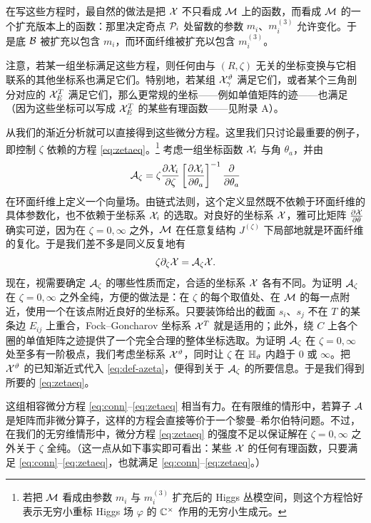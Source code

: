 在写这些方程时，最自然的做法是把 $\mathcal{X}$ 不只看成 $\mathcal{M}$ 上的函数，而看成 $\mathcal{M}$ 的一个扩充版本上的函数：那里决定奇点 $\mathcal{P}_i$ 处留数的参数 $m_i$、$m_i^{(3)}$ 允许变化。于是底 $\mathcal{B}$ 被扩充以包含 $m_i$，而环面纤维被扩充以包含 $m_i^{(3)}$。

注意，若某一组坐标满足这些方程，则任何由与 $(R,\zeta)$ 无关的坐标变换与它相联系的其他坐标系也满足它们。特别地，若某组 $\mathcal{X}^\vartheta_\gamma$ 满足它们，或者某个三角剖分对应的 $\mathcal{X}^T_E$ 满足它们，那么更常规的坐标——例如单值矩阵的迹——也满足（因为这些坐标可以写成 $\mathcal{X}^T_E$ 的某些有理函数——见附录 A）。%

从我们的渐近分析就可以直接得到这些微分方程。这里我们只讨论最重要的例子，即控制 $\zeta$ 依赖的方程 \eqref{eq:zetaeq}。\footnote{若把 $\mathcal{M}$ 看成由参数 $m_i$ 与 $m_i^{(3)}$ 扩充后的 Higgs 丛模空间，则这个方程恰好表示无穷小重标 Higgs 场 $\varphi$ 的 $\mathbb{C}^\times$ 作用的无穷小生成元。} 考虑一组坐标函数 $\mathcal{X}_i$ 与角 $\theta_a$，并由
\begin{equation} \label{eq:def-azeta}
\mathcal{A}_\zeta = \zeta\frac{\partial\mathcal{X}_i}{\partial\zeta}\left[\frac{\partial\mathcal{X}_i}{\partial\theta_a}\right]^{-1}\frac{\partial}{\partial\theta_a}
\end{equation}
在环面纤维上定义一个向量场。由链式法则，这个定义显然既不依赖于环面纤维的具体参数化，也不依赖于坐标系 $\mathcal{X}_i$ 的选取。对良好的坐标系 $\mathcal{X}$，雅可比矩阵 $\frac{\partial\mathcal{X}}{\partial\theta}$ 确实可逆，因为在 $\zeta=0,\infty$ 之外，$\mathcal{M}$ 在任意复结构 $J^{(\zeta)}$ 下局部地就是环面纤维的复化。于是我们差不多是同义反复地有
\begin{equation}
\zeta\partial_\zeta\mathcal{X} = \mathcal{A}_\zeta\mathcal{X}. \label{eq:zetaeqtaut}
\end{equation}
现在，视需要确定 $\mathcal{A}_\zeta$ 的哪些性质而定，合适的坐标系 $\mathcal{X}$ 各有不同。为证明 $\mathcal{A}_\zeta$ 在 $\zeta=0,\infty$ 之外全纯，方便的做法是：在 $\zeta$ 的每个取值处、在 $\mathcal{M}$ 的每一点附近，使用一个在该点附近良好的坐标系。只要装饰给出的截面 $s_i$、$s_j$ 不在 $T$ 的某条边 $E_{ij}$ 上重合，Fock–Goncharov 坐标系 $\mathcal{X}^T$ 就是适用的；此外，绕 $C$ 上各个圈的单值矩阵之迹提供了一个完全合理的整体坐标选取。为证明 $\mathcal{A}_\zeta$ 在 $\zeta=0,\infty$ 处至多有一阶极点，我们考虑坐标系 $\mathcal{X}^\vartheta$，同时让 $\zeta$ 在 ${\mathbb{H}}_\vartheta$ 内趋于 $0$ 或 $\infty$。把 $\mathcal{X}^\vartheta$ 的已知渐近式代入 \eqref{eq:def-azeta}，便得到关于 $\mathcal{A}_\zeta$ 的所要信息。于是我们得到所要的 \eqref{eq:zetaeq}。

这组相容微分方程 \eqref{eq:conn}–\eqref{eq:zetaeq} 相当有力。在有限维的情形中，若算子 $\mathcal{A}$ 是矩阵而非微分算子，这样的方程会直接等价于一个黎曼–希尔伯特问题。不过，在我们的无穷维情形中，微分方程 \eqref{eq:zetaeq} 的强度不足以保证解在 $\zeta=0,\infty$ 之外关于 $\zeta$ 全纯。（这一点从如下事实即可看出：某些 $\mathcal{X}$ 的任何有理函数，只要满足 \eqref{eq:conn}–\eqref{eq:zetaeq}，也就满足 \eqref{eq:conn}–\eqref{eq:zetaeq}。）

